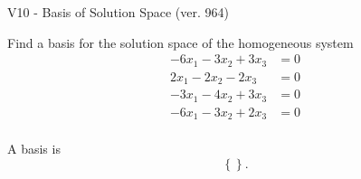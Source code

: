 \begin{exercise}
  \begin{exerciseTitle}V10 - Basis of Solution Space (ver. 964)\end{exerciseTitle}
  \begin{exerciseStatement}
    Find a basis for the solution space of the homogeneous system 
\begin{align*}
 -6 x_ 1 -3 x_ 2 + 3 x_ 3 &= 0  \\ 
  2 x_ 1 -2 x_ 2 -2 x_ 3 &= 0  \\ 
  -3 x_ 1 -4 x_ 2 + 3 x_ 3 &= 0  \\ 
  -6 x_ 1 -3 x_ 2 + 2 x_ 3 &= 0  \\ 
 \end{align*}


 
  \end{exerciseStatement}

  \begin{exerciseAnswer}
   A basis is   
\[\left\{\right\}.\]

  


  \end{exerciseAnswer}
\end{exercise}